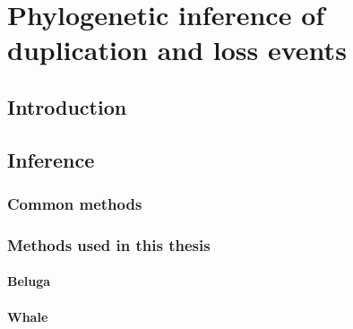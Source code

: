 \chapter{Phylogenetic inference of duplication and loss events}

\section{Introduction}

\section{Inference}
\subsection{Common methods}

\subsection{Methods used in this thesis}
\subsubsection{Beluga}
\subsubsection{Whale}
